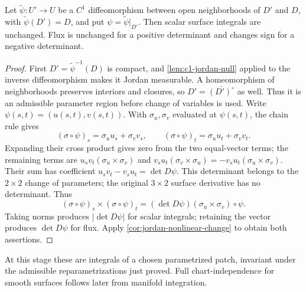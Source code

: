 
\begin{proposition}
Let $\widetilde\psi:U'\to U$ be a $C^1$ diffeomorphism between open
neighborhoods of $D'$ and $D$, with $\widetilde\psi(D')=D$, and put
$\psi=\widetilde\psi|_{D'}$. Then scalar surface integrals are unchanged. Flux is unchanged for a
positive determinant and changes sign for a negative determinant.
\end{proposition}
\begin{proof}
First $D'=\widetilde\psi^{-1}(D)$ is compact, and
\cref{lem:c1-jordan-null} applied to the inverse diffeomorphism makes it
Jordan measurable. A homeomorphism of neighborhoods preserves interiors
and closures, so $D'=\overline{(D')^\circ}$ as well. Thus it is an
admissible parameter region before change of variables is used.
Write $\psi(s,t)=(u(s,t),v(s,t))$. With $\sigma_u,\sigma_v$ evaluated
at $\psi(s,t)$, the chain rule gives
\[
(\sigma\circ\psi)_s=\sigma_u u_s+\sigma_v v_s,\qquad
(\sigma\circ\psi)_t=\sigma_u u_t+\sigma_v v_t.
\]
Expanding their cross product gives zero from the two equal-vector terms;
the remaining terms are $u_sv_t(\sigma_u\times\sigma_v)$ and
$v_su_t(\sigma_v\times\sigma_u)=-v_su_t(\sigma_u\times\sigma_v)$.
Their sum has coefficient $u_sv_t-v_su_t=\det D\psi$. This determinant
belongs to the $2\times2$ change of parameters; the original $3\times2$
surface derivative has no determinant. Thus
\[
(\sigma\circ\psi)_s\times(\sigma\circ\psi)_t
=(\det D\psi)(\sigma_u\times\sigma_v)\circ\psi.
\]
Taking norms produces $|\det D\psi|$ for scalar integrals; retaining the
vector produces $\det D\psi$ for flux. Apply \cref{cor:jordan-nonlinear-change} to obtain both assertions.
\end{proof}


At this stage these are integrals of a chosen parametrized patch,
invariant under the admissible reparametrizations just proved. Full
chart-independence for smooth surfaces follows later from manifold integration.

